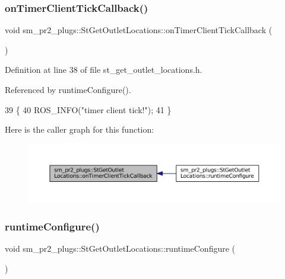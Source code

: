 \subsubsection{\texorpdfstring{on\+Timer\+Client\+Tick\+Callback()}{onTimerClientTickCallback()}}
{\footnotesize\ttfamily void sm\+\_\+pr2\+\_\+plugs\+::\+St\+Get\+Outlet\+Locations\+::on\+Timer\+Client\+Tick\+Callback (\begin{DoxyParamCaption}{ }\end{DoxyParamCaption})\hspace{0.3cm}{\ttfamily [inline]}}



Definition at line 38 of file st\+\_\+get\+\_\+outlet\+\_\+locations.\+h.



Referenced by runtime\+Configure().


\begin{DoxyCode}
39     \{
40         ROS\_INFO(\textcolor{stringliteral}{"timer client tick!"});
41     \}
\end{DoxyCode}
Here is the caller graph for this function\+:
\nopagebreak
\begin{figure}[H]
\begin{center}
\leavevmode
\includegraphics[width=350pt]{structsm__pr2__plugs_1_1StGetOutletLocations_a46a5f83dd8f5465356ab0652f34c9c52_icgraph}
\end{center}
\end{figure}
\mbox{\label{structsm__pr2__plugs_1_1StGetOutletLocations_ad5b299ff3f4253429690b22f3a81d9cf}} 
\subsubsection{\texorpdfstring{runtime\+Configure()}{runtimeConfigure()}}
{\footnotesize\ttfamily void sm\+\_\+pr2\+\_\+plugs\+::\+St\+Get\+Outlet\+Locations\+::runtime\+Configure (\begin{DoxyParamCaption}{ }\end{DoxyParamCaption})\hspace{0.3cm}{\ttfamily [inline]}}



